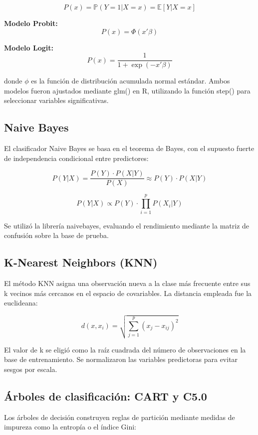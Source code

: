 \documentclass[Royal,times,sageh]{sagej}
\begin{document}
\[
P(x) = \mathbb{P}(Y=1|X=x) = \mathbb{E}[Y|X=x]
\]

\textbf{Modelo Probit:} \[
P(x) = \Phi(x'\beta)
\]

\textbf{Modelo Logit:} \[
P(x) = \frac{1}{1 + \exp(-x'\beta)}
\]

donde \(\phi\) es la función de distribución acumulada normal estándar.
Ambos modelos fueron ajustados mediante glm() en R, utilizando la
función step() para seleccionar variables significativas.

\subsection{Naive Bayes}\label{naive-bayes}

El clasificador Naive Bayes se basa en el teorema de Bayes, con el
supuesto fuerte de independencia condicional entre predictores:

\[
P(Y|X) = \frac{P(Y) \cdot P(X|Y)}{P(X)} \approx P(Y) \cdot P(X|Y)
\]


\[
P(Y|X) \propto P(Y) \cdot \prod_{i=1}^{p} P(X_i|Y)
\]

Se utilizó la librería naivebayes, evaluando el rendimiento mediante la
matriz de confusión sobre la base de prueba.

\subsection{K-Nearest Neighbors (KNN)}\label{k-nearest-neighbors-knn}

El método KNN asigna una observación nueva a la clase más frecuente
entre sus k vecinos más cercanos en el espacio de covariables. La
distancia empleada fue la euclideana:


\[
d(x, x_i) = \sqrt{ \sum_{j=1}^{p} (x_j - x_{ij})^2 }
\]

El valor de k se eligió como la raíz cuadrada del número de
observaciones en la base de entrenamiento. Se normalizaron las variables
predictoras para evitar sesgos por escala.

\subsection{Árboles de clasificación: CART y
C5.0}\label{uxe1rboles-de-clasificaciuxf3n-cart-y-c5.0}

Los árboles de decisión construyen reglas de partición mediante medidas
de impureza como la entropía o el índice Gini:
\end{document}
